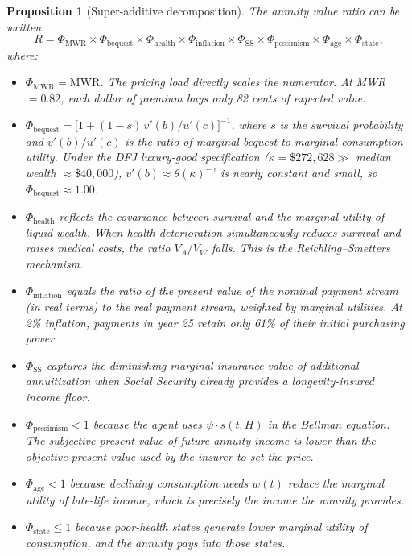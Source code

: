 \documentclass[12pt]{article}
\newtheorem{proposition}{Proposition}
\begin{document}
\begin{proposition}[Super-additive decomposition]
The annuity value ratio can be written
\begin{equation}
\label{eq:multiplicative_R}
R = \Phi_{\text{MWR}} \times \Phi_{\text{bequest}} \times \Phi_{\text{health}} \times \Phi_{\text{inflation}} \times \Phi_{\text{SS}} \times \Phi_{\text{pessimism}} \times \Phi_{\text{age}} \times \Phi_{\text{state}},
\end{equation}
where:
\begin{itemize}
\item $\Phi_{\text{MWR}} = \text{MWR}$. The pricing load directly scales the numerator. At MWR $= 0.82$, each dollar of premium buys only 82 cents of expected value.

\item $\Phi_{\text{bequest}} = \big[1 + (1 - s) \, v'(b) / u'(c)\big]^{-1}$, where $s$ is the survival probability and $v'(b)/u'(c)$ is the ratio of marginal bequest to marginal consumption utility. Under the DFJ luxury-good specification ($\kappa = \$272{,}628 \gg$ median wealth $\approx \$40{,}000$), $v'(b) \approx \theta(\kappa)^{-\gamma}$ is nearly constant and small, so $\Phi_{\text{bequest}} \approx 1.00$.

\item $\Phi_{\text{health}}$ reflects the covariance between survival and the marginal utility of liquid wealth. When health deterioration simultaneously reduces survival and raises medical costs, the ratio $V_A / V_W$ falls. This is the Reichling--Smetters mechanism.

\item $\Phi_{\text{inflation}}$ equals the ratio of the present value of the nominal payment stream (in real terms) to the real payment stream, weighted by marginal utilities. At 2\% inflation, payments in year 25 retain only 61\% of their initial purchasing power.

\item $\Phi_{\text{SS}}$ captures the diminishing marginal insurance value of additional annuitization when Social Security already provides a longevity-insured income floor.

\item $\Phi_{\text{pessimism}} < 1$ because the agent uses $\psi \cdot s(t,H)$ in the Bellman equation. The subjective present value of future annuity income is lower than the objective present value used by the insurer to set the price.

\item $\Phi_{\text{age}} < 1$ because declining consumption needs $w(t)$ reduce the marginal utility of late-life income, which is precisely the income the annuity provides.

\item $\Phi_{\text{state}} \leq 1$ because poor-health states generate lower marginal utility of consumption, and the annuity pays into those states.
\end{itemize}
\end{proposition}
\end{document}

